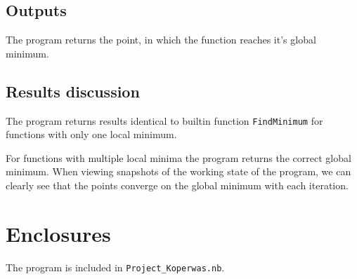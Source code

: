\documentclass[a4paper,12pt]{article}
\begin{document}
\subsection*{Outputs}

The program returns the point, in which the function reaches it's global
minimum.

\subsection*{Results discussion}

The program returns results identical to builtin function \texttt{FindMinimum}
for functions with only one local minimum.

For functions with multiple local minima the program returns the correct global
minimum. When viewing snapshots of the working state of the program, we can
clearly see that the points converge on the global minimum with each iteration.

\section*{Enclosures}

The program is included in \texttt{Project\_Koperwas.nb}.
\end{document}
